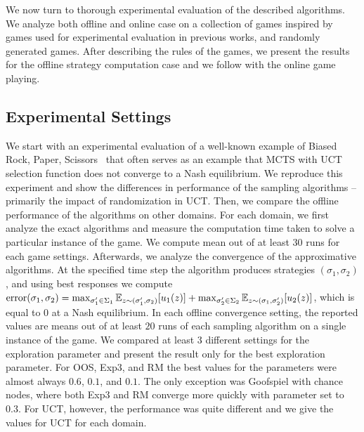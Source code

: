 
We now turn to thorough experimental evaluation of the described algorithms.
We analyze both offline and online case on a collection of games inspired by games used for experimental evaluation in previous works, and randomly generated games.
After describing the rules of the games, we present the results for the offline strategy computation case and we follow with the online game playing.

\subsection{Experimental Settings}


We start with an experimental evaluation of a well-known example of Biased Rock, Paper, Scissors~\cite{Shafiei09} that often serves
as an example that MCTS with UCT selection function does not converge to a Nash equilibrium.
We reproduce this experiment and show the differences in performance of the sampling algorithms -- primarily the impact of randomization in UCT.
Then, we compare the offline performance of the algorithms on other domains.
For each domain, we first analyze the exact algorithms and measure the computation time taken to solve a particular instance of the game.
We compute mean out of at least $30$ runs for each game settings.
Afterwards, we analyze the convergence of the approximative algorithms.
At the specified time step the algorithm produces strategies $(\sigma_1,\sigma_2)$, and using best responses we compute
$\textrm{error}(\sigma_1,\sigma_2) = \max_{\sigma_1' \in \Sigma_1} \mathbb{E}_{z \sim (\sigma_1',\sigma_2)}[u_1(z)]
                                   + \max_{\sigma_2' \in \Sigma_2} \mathbb{E}_{z \sim (\sigma_1,\sigma_2')}[u_2(z)]$,
which is equal to $0$ at a Nash equilibrium.
In each offline convergence setting, the reported values are means out of at least $20$ runs of each sampling algorithm on a single instance of the game.
We compared at least $3$ different settings for the exploration parameter and present the result only for the best exploration parameter.
For OOS, Exp3, and RM the best values for the parameters were almost always $0.6$, $0.1$, and $0.1$.
The only exception was Goofspiel with chance nodes, where both Exp3 and RM converge more quickly with parameter set to $0.3$.
For UCT, however, the performance was quite different and we give the values for UCT for each domain.

